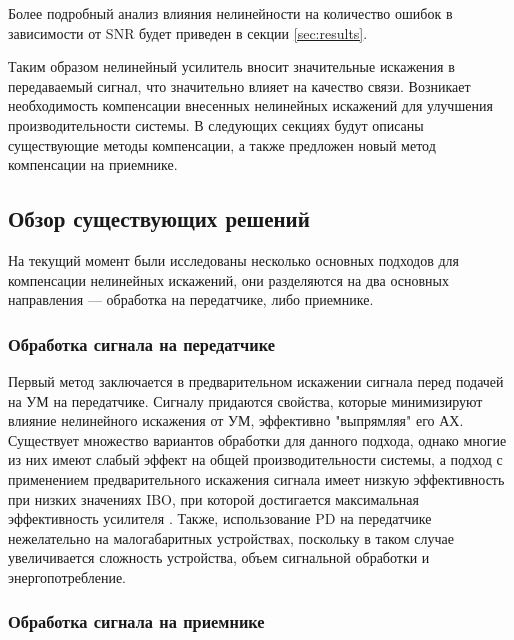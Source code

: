 Более подробный анализ влияния нелинейности на количество ошибок в
зависимости от SNR будет приведен в секции \ref{sec:results}.

Таким образом нелинейный усилитель вносит значительные искажения в
передаваемый сигнал, что значительно влияет на качество связи. Возникает
необходимость компенсации внесенных нелинейных искажений для улучшения
производительности системы. В следующих секциях будут описаны существующие
методы компенсации, а также предложен новый метод компенсации на приемнике.





\subsection{Обзор существующих решений}
На текущий момент были исследованы несколько основных подходов для
компенсации нелинейных искажений, они разделяются на два основных
направления — обработка на передатчике, либо приемнике.

\subsubsection{Обработка сигнала на передатчике}

Первый метод заключается в предварительном искажении сигнала перед
подачей на УМ на передатчике. Сигналу придаются свойства, которые
минимизируют влияние нелинейного искажения от УМ, эффективно "выпрямляя"
его АХ. Существует множество вариантов обработки для данного подхода,
однако многие из них имеют слабый эффект на общей производительности
системы, а подход с применением предварительного искажения сигнала имеет
низкую эффективность при низких значениях IBO, при которой достигается
максимальная эффективность усилителя \cite{sharath2015}
\cite{shabany2008} \cite{eda2001}. Также, использование PD на передатчике
нежелательно на малогабаритных устройствах, поскольку в таком случае
увеличивается сложность устройства, объем сигнальной обработки и энергопотребление.

\subsubsection{Обработка сигнала на приемнике}

